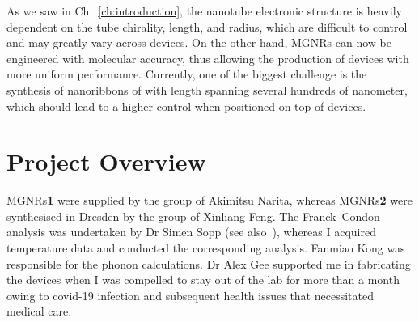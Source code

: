 As we saw in Ch.~\ref{ch:introduction}, the nanotube electronic structure is heavily dependent on the tube chirality, length, and radius, which are difficult to control and may greatly vary across devices. On the other hand, \glspl{MGNR} can now be engineered with molecular accuracy, thus allowing the production of devices with more uniform performance. Currently, one of the biggest challenge is the synthesis of nanoribbons of with length spanning several hundreds of nanometer, which should lead to a higher control when positioned on top of devices.

\section{Project Overview}
\glspl{MGNR}\textbf{1} were supplied by the group of Akimitsu Narita, whereas \glspl{MGNR}\textbf{2} were synthesised in Dresden by the group of Xinliang Feng. The Franck--Condon analysis was undertaken by Dr Simen Sopp (see also~\cite{sopp2021phd}), whereas I acquired temperature data and conducted the corresponding analysis. Fanmiao Kong was responsible for the phonon calculations. Dr Alex Gee supported me in fabricating the devices when I was compelled to stay out of the lab for more than a month owing to covid-19 infection and subsequent health issues that necessitated medical care.